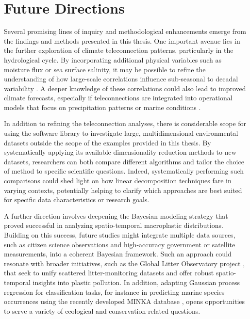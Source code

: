 
\section*{Future Directions}
Several promising lines of inquiry and methodological enhancements emerge from the findings and methods presented in this thesis. One important avenue lies in the further exploration of climate teleconnection patterns, particularly in the hydrological cycle. By incorporating additional physical variables such as moisture flux or sea surface salinity, it may be possible to refine the understanding of how large-scale correlations influence sub-seasonal to decadal variability \cite[e.g.][]{ballabrerapoy_potential_2002,rathore_improving_2021,li_skillful_2022}. A deeper knowledge of these correlations could also lead to improved climate forecasts, especially if teleconnections are integrated into operational models that focus on precipitation patterns or marine conditions \cite{li_skillful_2022,straaten_correcting_2023}.

In addition to refining the teleconnection analyses, there is considerable scope for using the  software library to investigate large, multidimensional environmental datasets outside the scope of the examples provided in this thesis. By systematically applying its available dimensionality reduction methods to new datasets, researchers can both compare different algorithms and tailor the choice of method to specific scientific questions. Indeed, systematically performing such comparisons could shed light on how linear decomposition techniques fare in varying contexts, potentially helping to clarify which approaches are best suited for specific data characteristics or research goals.

A further direction involves deepening the Bayesian modeling strategy that proved successful in analyzing spatio-temporal macroplastic distributions. Building on this success, future studies might integrate multiple data sources, such as citizen science observations and high-accuracy government or satellite measurements, into a coherent Bayesian framework. Such an approach could resonate with broader initiatives, such as the Global Litter Observatory project \cite{marine_litter_lab_global_2021}, that seek to unify scattered litter-monitoring datasets and offer robust spatio-temporal insights into plastic pollution. In addition, adapting Gaussian process regression for classification tasks, for instance in predicting marine species occurrences using the recently developed MINKA database \cite{luna_reyes_evaluation_2022}, opens opportunities to serve a variety of ecological and conservation-related questions. 


